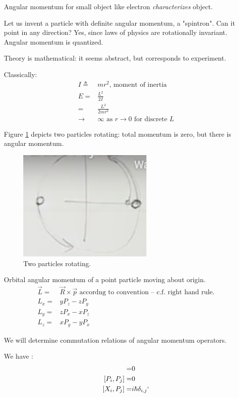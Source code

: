 \documentclass[]{article}
\begin{document}
Angular momentum for small object like electron \emph{characterizes} object.

Let us invent a particle with definite angular momentum, a "spintron". Can it point in any direction? Yes, since laws of physics are rotationally invariant. Angular momentum is quantized.

Theory is mathematical: it seems abstract, but corresponds to experiment.

Classically:
\begin{align*}
I\triangleq&mr^2 \text{, moment of inertia}\\
E=&\frac{L^2}{2I}\\
=&\frac{L^2}{2mr^2}\\
\rightarrow &\infty \text{ as } r \rightarrow 0 \text{ for discrete $L$}
\end{align*}

Figure \ref{fig:two:particles:rotating} depicts two particles rotating: total momentum is zero, but there is angular momentum.
\begin{figure}[H]
	\caption{Two particles rotating.}\label{fig:two:particles:rotating}
	\includegraphics[width=0.6\textwidth]{two-particles-rotating}
\end{figure}

Orbital angular momentum of a point particle moving about origin. 
\begin{align*}
\vec{L} =& \vec{R} \times \vec{p} \text{ accordng to convention -- c.f. right hand rule.}\\
L_x =& y P_z - z P_y\\
L_y =& z P_x - x P_z\\
L_z =& x P_y - y P_x
\end{align*}

We will determine commutation relations of angular momentum operators.

We have \cite{susskind2014quantum}:
\begin{align*}
	[X_i,X_j] =& 0\\
	[P_i,P_j]=& 0\\
	[X_i,P_j]=& i \hslash \delta_{i,j}`
\end{align*}
\end{document}
